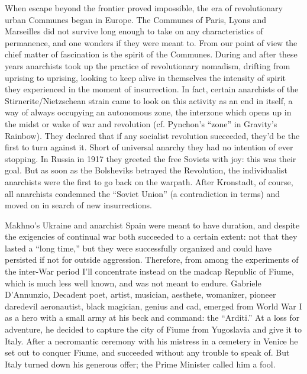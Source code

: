 \documentclass[a4paper,english,10pt,twoside]{article}
\begin{document}
\medskip
When escape beyond the frontier proved impossible, the era of revolutionary urban Communes began in Europe. The Communes of Paris, Lyons and Marseilles did not survive long enough to take on any characteristics of permanence, and one wonders if they were meant to. From our point of view the chief matter of fascination is the spirit of the Communes. During and after these years anarchists took up the practice of revolutionary nomadism, drifting from uprising to uprising, looking to keep alive in themselves the intensity of spirit they experienced in the moment of insurrection. In fact, certain anarchists of the Stirnerite/Nietzschean strain came to look on this activity as an end in itself, a way of always occupying an autonomous zone, the interzone which opens up in the midst or wake of war and revolution (cf. Pynchon's \enquote{zone} in Gravity's Rainbow). They declared that if any socialist revolution succeeded, they'd be the first to turn against it. Short of universal anarchy they had no intention of ever stopping. In Russia in 1917 they greeted the free Soviets with joy: this was their goal. But as soon as the Bolsheviks betrayed the Revolution, the individualist anarchists were the first to go back on the warpath. After Kronstadt, of course, all anarchists condemned the \enquote{Soviet Union} (a contradiction in terms) and moved on in search of new insurrections.

\medskip
Makhno's Ukraine and anarchist Spain were meant to have duration, and despite the exigencies of continual war both succeeded to a certain extent: not that they lasted a \enquote{long time,} but they were successfully organized and could have persisted if not for outside aggression. Therefore, from among the experiments of the inter-War period I'll concentrate instead on the madcap Republic of Fiume, which is much less well known, and was not meant to endure. Gabriele D'Annunzio, Decadent poet, artist, musician, aesthete, womanizer, pioneer daredevil aeronautist, black magician, genius and cad, emerged from World War I as a hero with a small army at his beck and command: the \enquote{Arditi.} At a loss for adventure, he decided to capture the city of Fiume from Yugoslavia and give it to Italy. After a necromantic ceremony with his mistress in a cemetery in Venice he set out to conquer Fiume, and succeeded without any trouble to speak of. But Italy turned down his generous offer; the Prime Minister called him a fool.
\end{document}
